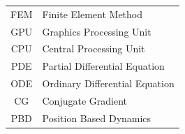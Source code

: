 \documentclass[en]{minipw} %
\begin{document}
\begin{tabular}{cl}
FEM & Finite Element Method \\
GPU & Graphics Processing Unit \\
CPU & Central Processing Unit \\
PDE & Partial Differential Equation \\
ODE & Ordinary Differential Equation \\
CG & Conjugate Gradient \\
PBD & Position Based Dynamics \\
\end{tabular}


\renewcommand{\listfigurename}{List of figures}
\listoffigures




\end{document}
